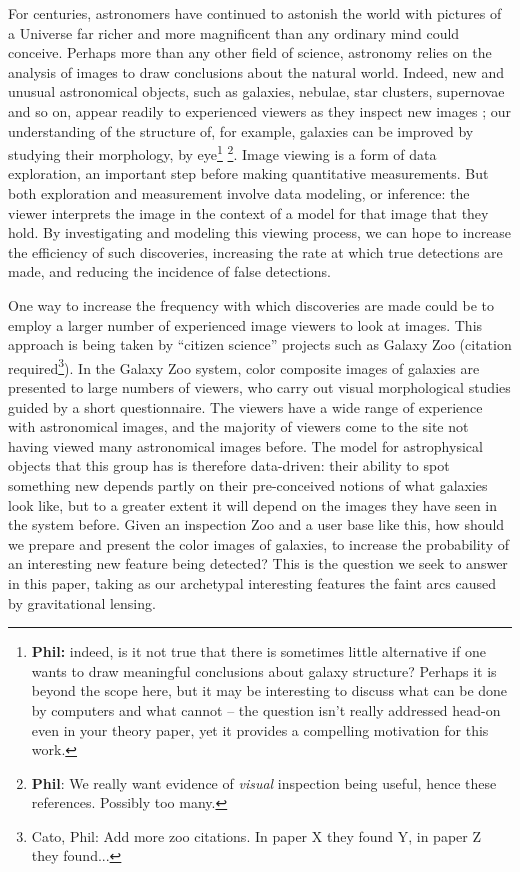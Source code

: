 \documentclass[letterpaper, 11pt]{article}
\begin{document}
For centuries, astronomers have continued to astonish the world with pictures of a Universe far richer and more magnificent than any ordinary mind could conceive. Perhaps more than any other field of science, astronomy relies on the analysis of images to draw conclusions about the natural world. Indeed, new and unusual astronomical objects, such as
galaxies, nebulae, star clusters, supernovae and so on, appear readily to
experienced viewers as they inspect new images \citep[a recent example is the amateur discovery of a quadruple star system, reported in][]{PH12}; our understanding of  the structure of, for example, galaxies can
be improved by studying their morphology, by eye\footnote{{\bf Phil:} indeed, is it not true that there is sometimes little alternative if one wants to draw meaningful conclusions about galaxy structure? Perhaps it is beyond the scope here, but it may be interesting to discuss what can be done by computers and what cannot -- the question isn't really addressed head-on even in your theory paper, yet it provides a compelling motivation for this work.} \citep[e.g.][]{Lah95, Lah++95, For++11, But11}\footnote{{\bf Phil}: We really want evidence of \emph{visual} inspection being useful, hence these references. Possibly too many.}.
Image viewing is a form of data exploration, an important step before making
quantitative measurements. But both exploration and measurement involve data
modeling, or inference: the viewer interprets the image in the context of a
model for that image that they hold.  By investigating and modeling this
viewing process, we can hope to increase the efficiency of such discoveries,
increasing the rate at which true detections are made, and reducing the
incidence of false detections. 

One way to increase the frequency with which discoveries are made  could be to
employ a larger number of experienced image viewers to look at images.  This
approach is being taken by ``citizen science'' projects such as Galaxy Zoo
(citation required\footnote{Cato, Phil: Add more zoo citations. In paper X they
found Y, in paper Z they found...}). In the Galaxy Zoo system, color composite
images of galaxies are presented to large numbers of viewers, who carry out
visual morphological studies guided by a short questionnaire. The viewers have
a wide range of experience with astronomical images, and the majority of
viewers come to the site not having viewed many astronomical images before.
The model for astrophysical objects that this group has is therefore
data-driven: their ability to spot something new depends partly on their
pre-conceived notions of what galaxies look like, but to a greater extent it
will depend on the images they have seen in the system before. Given an
inspection Zoo and a user base like this,  how should we prepare and present
the color images of galaxies, to increase the probability of an interesting
new feature being detected? This is the question we seek to answer in this
paper, taking as our archetypal interesting features the faint arcs caused by
gravitational lensing. 
\end{document}
